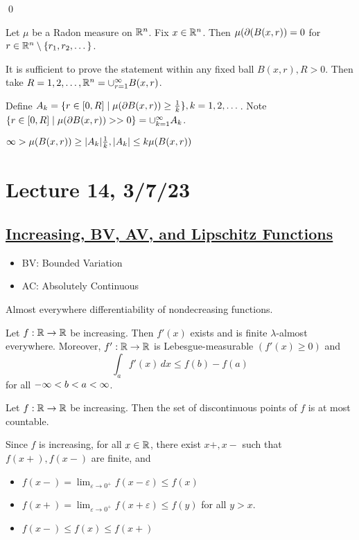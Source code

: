 \documentclass[x11names,reqno,14pt]{extarticle}
\newcommand{\seq}[2][\oo]{_{#2 = 1}^#1}
\newcommand{\cupk}[1][\oo]{\cup\seq[#1]{k}}
\begin{document}
\qed

\lem

Let $\mu$ be a Radon measure on $\mathbb{R}^n$. Fix $x\in\mathbb{R}^n$. Then $\mu(\partial(B(x, r)) = 0$ for $r \in \mathbb{R}^n\setminus\{r_1, r_2, \dots\}$. 

\proof

It is sufficient to prove the statement within any fixed ball $B(x, r), R> 0$. Then take $R = 1, 2, \dots, \R^n = \cup\seq{r}B(x, r)$.

Define $A_k = \{r\in[0,R]\mid \mu(\partial B(x, r)) \geq \frac{1}{k}\}, k = 1, 2, \dots $. Note $\{r\in[0,R]\mid \mu(\del B(x, r)) > >0 \} = \cupk A_k$. 

$\infty > \mu(B(x, r)) \geq |A_k|\frac{1}{k}, |A_k| \leq k\mu(B(x, r))$

\section*{Lecture 14, 3/7/23}

\subsection*{\underline{Increasing, BV, AV, and Lipschitz Functions}}

\begin{itemize}

\item BV: Bounded Variation

\item AC: Absolutely Continuous 

\end{itemize}

Almost everywhere differentiability of nondecreasing functions. 

\thm Let $f:\mathbb{R}\to\mathbb{R}$ be increasing. Then $f'(x)$ exists and is finite $\lambda$-almost everywhere. Moreover, $f':\mathbb{R}\to\mathbb{R}$ is Lebesgue-measurable $(f'(x)\geq0)$ and 
\[
\int_af'(x)\,dx \leq f(b) - f(a) 
\]
for all $-\infty<b<a<\infty$. 

\lem Let $f:\mathbb{R}\to\mathbb{R}$ be increasing. Then the set of discontinuous points of $f$ is at most countable. 

\proof

Since $f$ is increasing, for all $x \in \mathbb{R}$, there exist $x+, x-$ such that $f(x+), f(x-)$ are finite, and 
\begin{itemize}

\item $f(x-) = \lim_{\varepsilon\to0^+}f(x - \varepsilon) \leq f(x)$ 

\item $f(x+) = \lim_{\varepsilon\to0^+}f(x + \varepsilon) \leq f(y)$ for all $y > x$. 

\item $f(x-) \leq f(x) \leq f(x+)$

\end{itemize}
\end{document}
